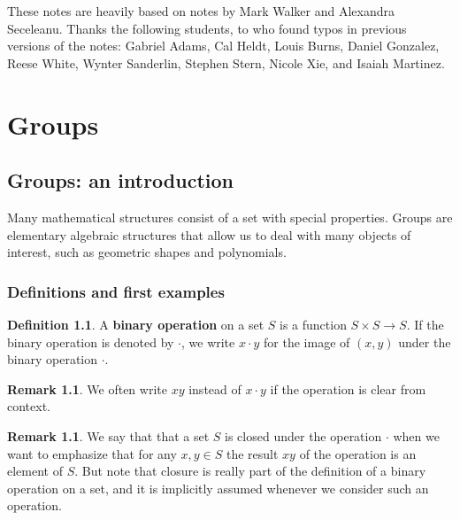 \documentclass[12pt]{report}
\numberwithin{equation}{section}
\numberwithin{theorem}{chapter}
\theoremstyle{definition}
\newtheorem{definition}[theorem]{Definition}
\newtheorem*{basic properties}{Basic Properties}
\newtheorem*{Important Remark}{Important Remark}
\newtheorem{remark}[theorem]{Remark}
\newcommand{\df}[1]{{\bf #1}\index{#1}}
\begin{document}
These notes are heavily based on notes by Mark Walker and Alexandra Seceleanu. Thanks the following students, to who found typos in previous versions of the notes: Gabriel Adams, Cal Heldt, Louis Burns, Daniel Gonzalez, Reese White, Wynter Sanderlin, Stephen Stern, Nicole Xie, and Isaiah Martinez.






\tableofcontents {}
{\protect\thispagestyle{myheadings}\markright{}}


\newpage





\part{Groups}



\chapter{Groups: an introduction}

Many mathematical structures consist of a set with special properties. Groups are elementary algebraic structures that allow us to deal with many objects of interest, such as geometric shapes and polynomials.

\section{Definitions and first examples}

\begin{definition}
A \df{binary operation} on a set $S$ is a function $S \times S \to S$. If the binary operation is denoted by $\cdot$, we write $x \cdot y$ for the image of $(x,y)$ under the binary operation $\cdot$.
	
\end{definition}
 
\begin{remark}
We often write $xy$ instead of $x \cdot y$ if the operation is clear from context.
\end{remark}

\begin{remark} 
We say that that a set $S$ is closed under the operation $\cdot$ when we want to emphasize that for any $x,y\in S$ the result $xy$ of the operation is an element of $S$.  But note that closure is really part of the definition of a binary operation on a set, and it is implicitly assumed whenever we consider such an operation.
\end{remark}
\end{document}
